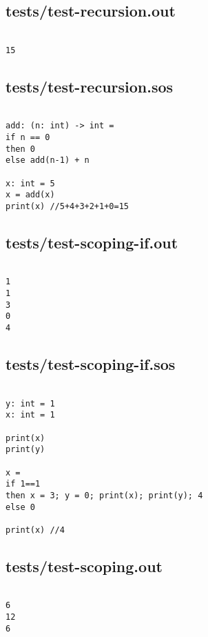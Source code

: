 \documentclass[main.tex]{subfiles}
\begin{document}
\subsection{tests/test-recursion.out}

\begin{lstlisting}

15
\end{lstlisting}

\subsection{tests/test-recursion.sos}

\begin{lstlisting}

add: (n: int) -> int = 
if n == 0
then 0
else add(n-1) + n

x: int = 5
x = add(x)
print(x) //5+4+3+2+1+0=15

\end{lstlisting}

\subsection{tests/test-scoping-if.out}

\begin{lstlisting}

1
1
3
0
4
\end{lstlisting}

\subsection{tests/test-scoping-if.sos}

\begin{lstlisting}

y: int = 1
x: int = 1

print(x)
print(y)

x = 
if 1==1
then x = 3; y = 0; print(x); print(y); 4
else 0

print(x) //4
\end{lstlisting}

\subsection{tests/test-scoping.out}

\begin{lstlisting}

6
12
6
\end{lstlisting}
\end{document}
